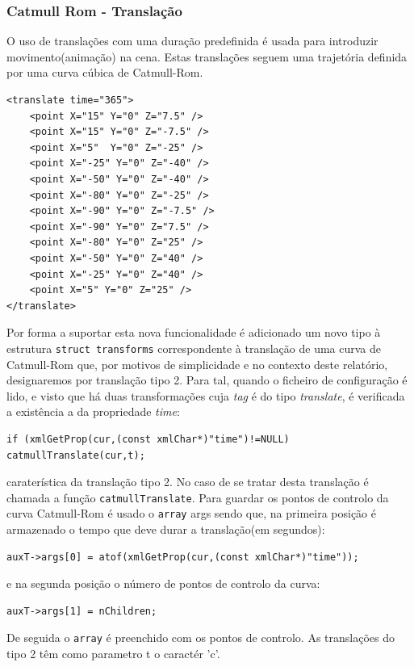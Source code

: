 \documentclass{article}
\begin{document}
\subsubsection{Catmull Rom - Translação}
O uso de translações com uma duração predefinida é usada para introduzir movimento(animação) na cena. Estas translações seguem uma trajetória definida por uma curva cúbica de Catmull-Rom.
\begin{verbatim}
<translate time="365">
    <point X="15" Y="0" Z="7.5" />
    <point X="15" Y="0" Z="-7.5" />
    <point X="5"  Y="0" Z="-25" />
    <point X="-25" Y="0" Z="-40" />
    <point X="-50" Y="0" Z="-40" />
    <point X="-80" Y="0" Z="-25" />
    <point X="-90" Y="0" Z="-7.5" />
    <point X="-90" Y="0" Z="7.5" />
    <point X="-80" Y="0" Z="25" />
    <point X="-50" Y="0" Z="40" />
    <point X="-25" Y="0" Z="40" />
    <point X="5" Y="0" Z="25" />
</translate>
\end{verbatim}
Por forma a suportar esta nova funcionalidade é adicionado um novo tipo à estrutura \texttt{struct transforms} correspondente à translação de uma curva de Catmull-Rom que, por motivos de simplicidade e no contexto deste relatório, designaremos por translação tipo 2.
Para tal, quando o ficheiro de configuração é lido, e visto que há duas transformações cuja \textit{tag} é do tipo \textit{translate}, é verificada a existência a
da propriedade \textit{time}: 
\begin{verbatim}
if (xmlGetProp(cur,(const xmlChar*)"time")!=NULL) catmullTranslate(cur,t);
\end{verbatim}
caraterística da translação tipo 2. No caso de se tratar desta translação é chamada a função \texttt{catmullTranslate}.
Para guardar os pontos de controlo da curva Catmull-Rom é usado o \texttt{array} args sendo que, na primeira posição é armazenado o tempo que deve durar a translação(em segundos): 
\begin{verbatim}
auxT->args[0] = atof(xmlGetProp(cur,(const xmlChar*)"time")); 
\end{verbatim}
e na segunda posição o número de pontos de controlo  da curva: 
\begin{verbatim}
auxT->args[1] = nChildren;
\end{verbatim}
De seguida o \texttt{array} é preenchido com os pontos de controlo. As translações do tipo 2 têm como parametro t o caractér 'c'.
\end{document}
